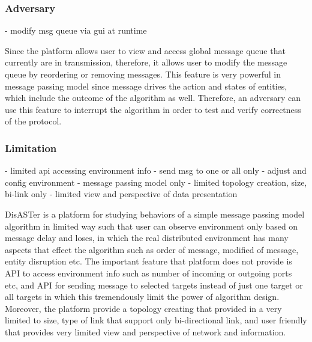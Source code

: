 \subsubsection{Adversary}
- modify msg queue via gui at runtime

Since the platform allows user to view and access global message queue that currently are in transmission, therefore, it allows user to modify the message queue by reordering or removing messages. This feature is very powerful in message passing model since message drives the action and states of entities, which include the outcome of the algorithm as well. Therefore, an adversary can use this feature to interrupt the algorithm in order to test and verify correctness of the protocol.

\subsubsection{Limitation}
- limited api accessing environment info
- send msg to one or all only
- adjust and config environment
- message passing model only
- limited topology creation, size, bi-link only
- limited view and perspective of data presentation

DisASTer is a platform for studying behaviors of a simple message passing model algorithm in limited way such that user can observe environment only based on message delay and loses, in which the real distributed environment has many aspects that effect the algorithm such as order of message, modified of message, entity disruption etc. The important feature that platform does not provide is API to access environment info such as number of incoming or outgoing ports etc, and API for sending message to selected targets instead of just one target or all targets in which this tremendously limit the power of algorithm design. Moreover, the platform provide a topology creating that provided in a very limited to size, type of link that support only bi-directional link, and user friendly that provides very limited view and perspective of network and information.

